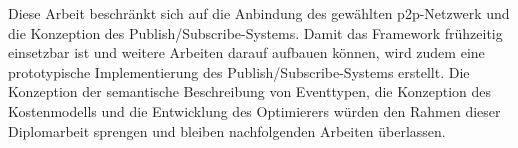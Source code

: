 Diese Arbeit beschränkt sich auf die Anbindung des gewählten \ac{p2p}-Netzwerk und die Konzeption des Publish/Subscribe-Systems. Damit das Framework frühzeitig einsetzbar ist und weitere Arbeiten darauf aufbauen können, wird zudem eine prototypische Implementierung des Publish/Subscribe-Systems erstellt. Die Konzeption der semantische Beschreibung von Eventtypen, die Konzeption des Kostenmodells und die Entwicklung des Optimierers würden den Rahmen dieser Diplomarbeit sprengen und bleiben nachfolgenden Arbeiten überlassen.
